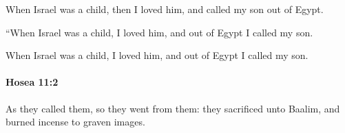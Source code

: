 			\begin{versebox}
					\item[BHS] 
					\item[LXX] 
					\item[ASV] When Israel was a child, then I loved him, and called my son out of Egypt.
					\item[NIV] “When Israel was a child, I loved him, and out of Egypt I called my son.
					\item[NRSV] When Israel was a child, I loved him, and out of Egypt I called my son.
			\end{versebox}

		\paragraph{Hosea 11:2} %
			\label{HOSEA-11-2}

			As they called them, so they went from them: they sacrificed unto Baalim, and burned incense to graven images.

